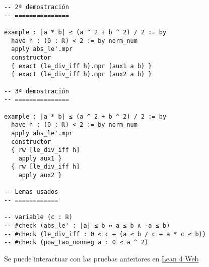 \begin{verbatim}
-- 2ª demostración
-- ===============

example : |a * b| ≤ (a ^ 2 + b ^ 2) / 2 := by
  have h : (0 : ℝ) < 2 := by norm_num
  apply abs_le'.mpr
  constructor
  { exact (le_div_iff h).mpr (aux1 a b) }
  { exact (le_div_iff h).mpr (aux2 a b) }

-- 3ª demostración
-- ===============

example : |a * b| ≤ (a ^ 2 + b ^ 2) / 2 := by
  have h : (0 : ℝ) < 2 := by norm_num
  apply abs_le'.mpr
  constructor
  { rw [le_div_iff h]
    apply aux1 }
  { rw [le_div_iff h]
    apply aux2 }

-- Lemas usados
-- ============

-- variable (c : ℝ)
-- #check (abs_le' : |a| ≤ b ↔ a ≤ b ∧ -a ≤ b)
-- #check (le_div_iff : 0 < c → (a ≤ b / c ↔ a * c ≤ b))
-- #check (pow_two_nonneg a : 0 ≤ a ^ 2)
\end{verbatim}
Se puede interactuar con las pruebas anteriores en \href{https://lean.math.hhu.de/\#url=https://raw.githubusercontent.com/jaalonso/Calculemus2/main/src/Ejercicio\_desigualdades\_absolutas.lean}{Lean 4 Web}

